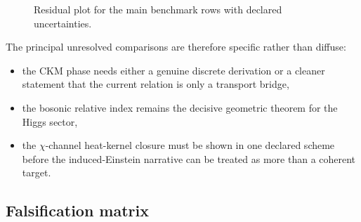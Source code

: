 \documentclass[11pt,a4paper]{article}
\theoremstyle{definition}
\theoremstyle{remark}
\begin{document}
\begin{figure}[t]
\centering
{}
\caption{Residual plot for the main benchmark rows with declared uncertainties.}
\label{fig:residual-plot}
\end{figure}

The principal unresolved comparisons are therefore specific rather than diffuse:
\begin{itemize}[leftmargin=1.5em, topsep=3pt, itemsep=2pt]
    \item the CKM phase needs either a genuine discrete derivation or a cleaner statement that the current relation is only a transport bridge,
    \item the bosonic relative index remains the decisive geometric theorem for the Higgs sector,
    \item the $\chi$-channel heat-kernel closure must be shown in one declared scheme before the induced-Einstein narrative can be treated as more than a coherent target.
\end{itemize}

\subsection{Falsification matrix}
\end{document}
